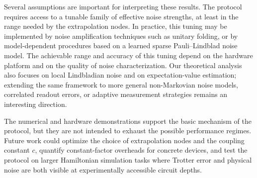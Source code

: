\documentclass[11pt]{article}
\begin{document}
Several assumptions are important for interpreting these results. The protocol requires access to a tunable family of effective noise strengths, at least in the range needed by the extrapolation nodes. In practice, this tuning may be implemented by noise amplification techniques such as unitary folding, or by model-dependent procedures based on a learned sparse Pauli--Lindblad noise model. The achievable range and accuracy of this tuning depend on the hardware platform and on the quality of noise characterization. Our theoretical analysis also focuses on local Lindbladian noise and on expectation-value estimation; extending the same framework to more general non-Markovian noise models, correlated readout errors, or adaptive measurement strategies remains an interesting direction.

The numerical and hardware demonstrations support the basic mechanism of the protocol, but they are not intended to exhaust the possible performance regimes. Future work could optimize the choice of extrapolation nodes and the coupling constant $c$, quantify constant-factor overheads for concrete devices, and test the protocol on larger Hamiltonian simulation tasks where Trotter error and physical noise are both visible at experimentally accessible circuit depths.



\appendix
\end{document}
